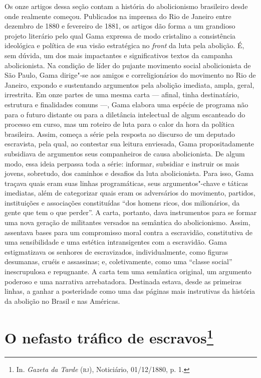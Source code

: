 {\footnotesize\noindent
Os onze artigos dessa seção contam a
história do abolicionismo brasileiro desde onde realmente começou. 
Publicados na imprensa do Rio de Janeiro entre
dezembro de 1880 e fevereiro de 1881, os artigos dão forma a um grandioso projeto literário pelo qual Gama expressa de modo cristalino a
consistência ideológica e política de sua visão estratégica no
\textit{front} da luta pela abolição. É, sem dúvida, um dos mais impactantes e
significativos textos da campanha abolicionista. Na condição de líder do
pujante movimento social abolicionista de São Paulo, Gama dirige"-se aos
amigos e correligionários do movimento no Rio de Janeiro, expondo e
sustentando argumentos pela abolição imediata, ampla, geral, irrestrita.
Em onze partes de uma mesma carta --- afinal, tinha destinatário,
estrutura e finalidades comuns ---, Gama elabora uma espécie de programa
não para o futuro distante ou para a diletância intelectual de algum
escanteado do processo em curso, mas um roteiro de luta para o calor da
hora da política brasileira. 
Assim, começa a série pela resposta ao
discurso de um deputado escravista, pela qual,
ao contestar sua leitura enviesada, Gama
propositadamente subsidiava de argumentos seus companheiros de causa
abolicionista.
De algum modo, essa
ideia perpassa toda a série: informar, subsidiar e instruir os mais
jovens, sobretudo, dos caminhos e desafios da luta abolicionista. Para
isso, Gama traçava quais eram suas linhas programáticas, seus
argumentos"-chave e táticas imediatas, além de categorizar quais eram os
adversários do movimento, partidos, instituições e associações
constituídas ``dos homens ricos, dos milionários, da gente que tem o que
perder''. 
A carta, portanto, dava instrumentos para se formar uma nova
geração de militantes versados na semântica do abolicionismo.
Assim, assentava bases para um compromisso moral contra a escravidão,
constitutiva de uma sensibilidade e uma estética intransigentes com a
escravidão. Gama estigmatizava os senhores de
escravizados, individualmente, como figuras desumanas, cruéis e
assassinas; e, coletivamente, como uma ``classe social'' inescrupulosa e
repugnante. A carta tem uma semântica original, um argumento poderoso e uma
narrativa arrebatadora. Destinada estava,
desde as primeiras linhas, a ganhar a posteridade como uma das páginas
mais instrutivas da história da abolição no Brasil e nas Américas.}
\@openrighttrue\makeatother \endgroup

\chapter{O nefasto tráfico de escravos\footnote[*]{In. \emph{Gazeta da Tarde}
  (\textsc{rj}), Noticiário, 01/12/1880, p. 1.}}


